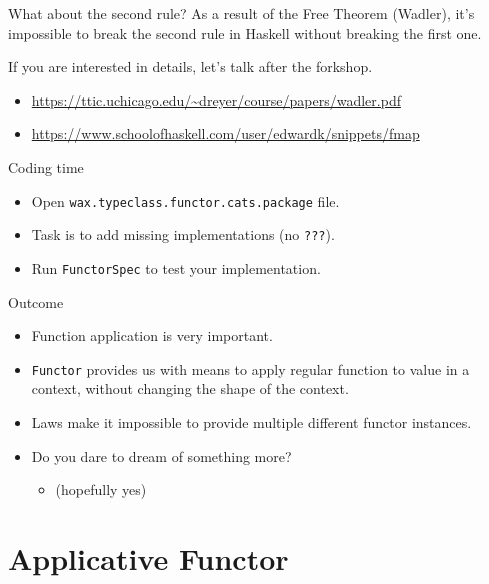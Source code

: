 \documentclass[presentation,aspectratio=169,smaller]{beamer}
\begin{document}
\begin{frame}[label={sec:orgbc7d889}]{What about the second rule?}
As a result of the Free Theorem (Wadler), it's impossible to break the second
rule in Haskell without breaking the first one.

If you are interested in details, let's talk after the forkshop.

\begin{itemize}
\item \url{https://ttic.uchicago.edu/\~dreyer/course/papers/wadler.pdf}
\item \url{https://www.schoolofhaskell.com/user/edwardk/snippets/fmap}
\end{itemize}
\end{frame}

\begin{frame}[label={sec:org2cd3d82},fragile]{Coding time}
 \begin{itemize}
\item Open \texttt{wax.typeclass.functor.cats.package} file.
\item Task is to add missing implementations (no \texttt{???}).
\item Run \texttt{FunctorSpec} to test your implementation.
\end{itemize}
\end{frame}

\begin{frame}[label={sec:org506d3db},fragile]{Outcome}
 \begin{itemize}
\item Function application is very important.
\item \texttt{Functor} provides us with means to apply regular function to value in a
context, without changing the shape of the context.
\item Laws make it impossible to provide multiple different functor instances.
\item Do you dare to dream of something more?
\begin{itemize}
\item <2-> (hopefully yes)
\end{itemize}
\end{itemize}
\end{frame}

\section{Applicative Functor}
\label{sec:org95b83b1}
\end{document}
